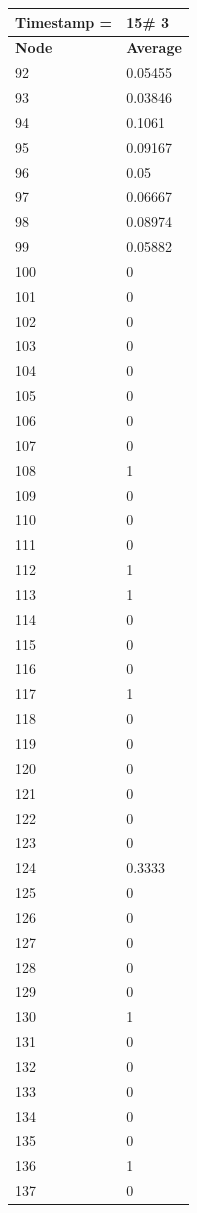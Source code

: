 \begin{tabular}{|l||l|}
\hline
\textbf{Timestamp =} & \textbf{15}\# 3\\\hline
	\textbf{Node} & \textbf{Average} \\ \hline
\hline
	92 & 0.05455 \\ \hline
	93 & 0.03846 \\ \hline
	94 & 0.1061 \\ \hline
	95 & 0.09167 \\ \hline
	96 & 0.05 \\ \hline
	97 & 0.06667 \\ \hline
	98 & 0.08974 \\ \hline
	99 & 0.05882 \\ \hline
	100 & 0 \\ \hline
	101 & 0 \\ \hline
	102 & 0 \\ \hline
	103 & 0 \\ \hline
	104 & 0 \\ \hline
	105 & 0 \\ \hline
	106 & 0 \\ \hline
	107 & 0 \\ \hline
	108 & 1 \\ \hline
	109 & 0 \\ \hline
	110 & 0 \\ \hline
	111 & 0 \\ \hline
	112 & 1 \\ \hline
	113 & 1 \\ \hline
	114 & 0 \\ \hline
	115 & 0 \\ \hline
	116 & 0 \\ \hline
	117 & 1 \\ \hline
	118 & 0 \\ \hline
	119 & 0 \\ \hline
	120 & 0 \\ \hline
	121 & 0 \\ \hline
	122 & 0 \\ \hline
	123 & 0 \\ \hline
	124 & 0.3333 \\ \hline
	125 & 0 \\ \hline
	126 & 0 \\ \hline
	127 & 0 \\ \hline
	128 & 0 \\ \hline
	129 & 0 \\ \hline
	130 & 1 \\ \hline
	131 & 0 \\ \hline
	132 & 0 \\ \hline
	133 & 0 \\ \hline
	134 & 0 \\ \hline
	135 & 0 \\ \hline
	136 & 1 \\ \hline
	137 & 0 \\ \hline
\end{tabular}

